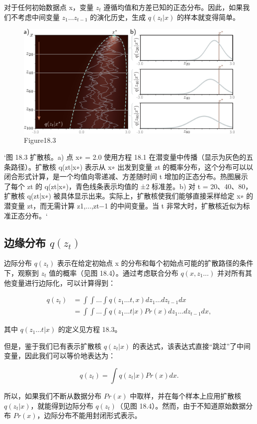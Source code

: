 对于任何初始数据点 x，变量 \(z_t\) 遵循均值和方差已知的正态分布。因此，如果我们不考虑中间变量 \(z_1 \ldots z_{t-1}\) 的演化历史，生成 \(q(z_t|x)\) 的样本就变得简单。


\begin{figure}[h!]
\centering
\includegraphics[width=0.7\linewidth]{png/chapter18/DiffusionKernel.png}
\caption{Figure18.3}
\end{figure}

`图 18.3 扩散核。a) 点 x∗ = 2.0 使用方程 18.1 在潜变量中传播（显示为灰色的五条路径）。扩散核 q(zt|x∗) 表示从 x∗ 出发到变量 zt 的概率分布，这个分布可以以闭合形式计算，是一个均值向零递减、方差随时间 t 增加的正态分布。热图展示了每个 zt 的 q(zt|x∗)，青色线条表示均值的 ±2 标准差。b) 对 t = 20、40、80，扩散核 q(zt|x∗) 被具体显示出来。实际上，扩散核使我们能够直接采样给定 x∗ 的潜变量 zt，而无需计算 z1,...,zt−1 的中间变量。当 t 非常大时，扩散核近似为标准正态分布。`

\subsection{边缘分布 \(q(z_t)\)}
边际分布 \(q(z_t)\) 表示在给定初始点 x 的分布和每个初始点可能的扩散路径的条件下，观察到 \(z_t\) 值的概率（见图 18.4）。通过考虑联合分布 \(q(x, z_1\ldots)\) 并对所有其他变量进行边际化，可以计算得到：


\begin{align}
q(z_t) &= \int \int \ldots \int q(z_1\ldots t, x) dz_1\ldots dz_{t-1}dx \\
&= \int \int \ldots \int q(z_1\ldots t|x) Pr(x) dz_1\ldots dz_{t-1}dx,
\end{align} 


其中 \(q(z_1\ldots t|x)\) 的定义见方程 18.3。

但是，鉴于我们已有表示扩散核 \(q(z_t|x)\) 的表达式，该表达式直接“跳过”了中间变量，因此我们可以等价地表达为：

\[
q(z_t) = \int q(z_t|x) Pr(x)dx. \tag{18.10}
\]

所以，如果我们不断从数据分布 \(Pr(x)\) 中取样，并在每个样本上应用扩散核 \(q(z_t|x)\)，就能得到边际分布 \(q(z_t)\)（见图 18.4）。然而，由于不知道原始数据分布 \(Pr(x)\)，边际分布不能用封闭形式表示。

